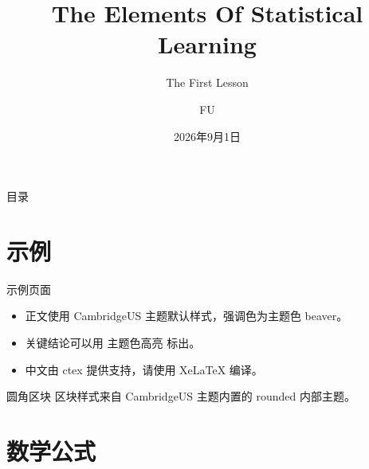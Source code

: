 \documentclass[aspectratio=169, 11pt]{ctexbeamer}
\title[The Elements Of Statistical Learning]{The Elements Of Statistical Learning}
\subtitle{The First Lesson}
\author[FU]{FU}
\institute[暨南大学经济学院]{暨南大学经济学院}
\date{2026年9月1日}
\begin{document}
\begin{frame}
  \titlepage
\end{frame}

\begin{frame}{目录}
  \tableofcontents
\end{frame}

\section{示例}

\begin{frame}{示例页面}
  \begin{itemize}
    \item 正文使用 CambridgeUS 主题默认样式，强调色为主题色 beaver。
    \item 关键结论可以用 \alert{主题色高亮} 标出。
    \item 中文由 ctex 提供支持，请使用 XeLaTeX 编译。
  \end{itemize}
  \vspace{0.6em}
  \begin{block}{圆角区块}
    区块样式来自 CambridgeUS 主题内置的 rounded 内部主题。
  \end{block}
\end{frame}

\section{数学公式}
\end{document}

